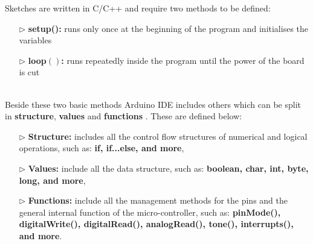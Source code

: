 \documentclass[12pt,a4paper]{report}
\begin{document}
Sketches are written in C/C++ and require two methods to be defined:
\begin{itemize}
    \item[$\triangleright$] \textbf{setup():} runs only once at the beginning of the program and initialises the variables
    \item[$\triangleright$] \textbf{loop$()$:} runs repeatedly inside the program until the power of the board is cut
\end{itemize}
\ \\
Beside these two basic methods Arduino IDE includes others which can be split in \textbf{structure}, \textbf{values} and \textbf{functions} \cite{website:arduinosoftware}. These are defined below: 
\begin{itemize}
    \item[$\triangleright$] \textbf{Structure:} includes all the control flow structures of numerical and logical operations, such as: \textbf{if, if...else, and more}, 
    \item[$\triangleright$] \textbf{Values:} include all the data structure, such as: \textbf{boolean, char, int, byte, long, and more},
    \item[$\triangleright$] \textbf{Functions:} include all the management methods for the pins and the general internal function of the micro-controller, such as: \textbf{pinMode(), digitalWrite(), digitalRead(), analogRead(), tone(), interrupts(), and more}.
\end{itemize}
\ \\
%
\end{document}
